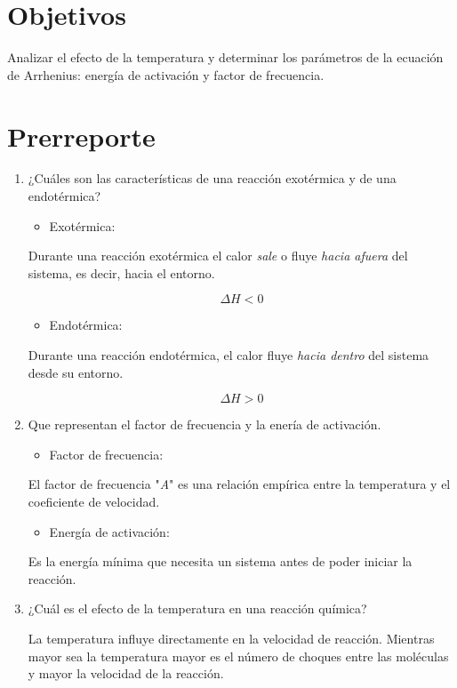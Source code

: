 \documentclass[12pt,letterpaper]{article}
\begin{document}
\section{Objetivos}
  \justify
Analizar el efecto de la temperatura y determinar los parámetros de la ecuación de
Arrhenius: energía de activación y factor de frecuencia.
%
%
%
\section{Prerreporte}
    \begin{enumerate}
        \item ¿Cuáles son las características de una reacción exotérmica y de una endotérmica?
        \begin{itemize}
            \item Exotérmica:
        \end{itemize}
        Durante una reacción exotérmica el calor \textit{sale} o fluye \textit{hacia afuera} del sistema, es decir, hacia el entorno.

        $$\Delta H<0$$
        \begin{itemize}
            \item Endotérmica:
            \end{itemize}
            Durante una reacción endotérmica, el calor fluye \textit{hacia dentro} del sistema desde su entorno.

            $$\Delta H>0$$
        \item Que representan el factor de frecuencia y la enería de activación.
        \begin{itemize}
            \item Factor de frecuencia:
        \end{itemize}
        El factor de frecuencia "\textit{A}" es una relación empírica entre la temperatura y el coeficiente de velocidad.

        \begin{itemize}
            \item Energía de activación:
        \end{itemize}
         Es la energía mínima que necesita un sistema antes de poder iniciar la reacción.

        \item  ¿Cuál es el efecto de la temperatura en una reacción química?

        La temperatura influye directamente en la velocidad de reacción. Mientras mayor sea la temperatura mayor es el número de choques entre las moléculas y mayor la velocidad de la reacción.
    \end{enumerate}
\end{document}
